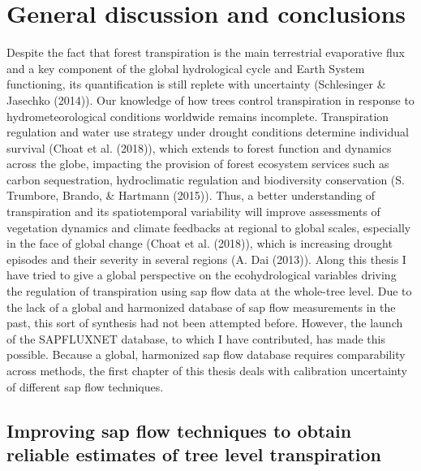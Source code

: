 \documentclass[11pt,twoside]{reedthesis}
\begin{document}
\chapter[General discussion and conclusions]{General discussion and conclusions}

\setlength{\parskip}{0.2cm plus4mm minus3mm}

\newpage

\setlength{\parindent}{0pt} Despite the fact that forest transpiration
is the main terrestrial evaporative flux and a key component of the
global hydrological cycle and Earth System functioning, its
quantification is still replete with uncertainty (Schlesinger \&
Jasechko (2014)). Our knowledge of how trees control transpiration in
response to hydrometeorological conditions worldwide remains incomplete.
Transpiration regulation and water use strategy under drought conditions
determine individual survival (Choat et al. (2018)), which extends to
forest function and dynamics across the globe, impacting the provision
of forest ecosystem services such as carbon sequestration, hydroclimatic
regulation and biodiversity conservation (S. Trumbore, Brando, \&
Hartmann (2015)). Thus, a better understanding of transpiration and its
spatiotemporal variability will improve assessments of vegetation
dynamics and climate feedbacks at regional to global scales, especially
in the face of global change (Choat et al. (2018)), which is increasing
drought episodes and their severity in several regions (A. Dai (2013)).
Along this thesis I have tried to give a global perspective on the
ecohydrological variables driving the regulation of transpiration using
sap flow data at the whole-tree level. Due to the lack of a global and
harmonized database of sap flow measurements in the past, this sort of
synthesis had not been attempted before. However, the launch of the
SAPFLUXNET database, to which I have contributed, has made this
possible. Because a global, harmonized sap flow database requires
comparability across methods, the first chapter of this thesis deals
with calibration uncertainty of different sap flow techniques. \par

\section{Improving sap flow techniques to obtain reliable estimates of
tree level
transpiration}\label{improving-sap-flow-techniques-to-obtain-reliable-estimates-of-tree-level-transpiration}
\end{document}
